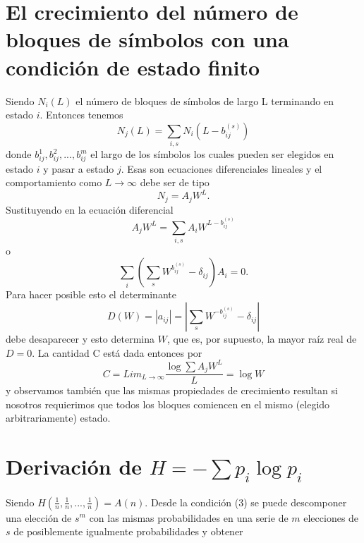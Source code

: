 \begin{appendices}

\chapter{El crecimiento del n\'umero de bloques de s\'imbolos con una
condici\'on de estado finito}

Siendo $N_{i}(L)$ el n\'umero de bloques de s\'imbolos de largo L
terminando en estado $i$.  Entonces tenemos
\begin{equation}
N_{j}(L)=\sum_{i,s} N_{i}(L-b_{ij}^{(s)})
\end{equation}
donde $b_{ij}^{1},b_{ij}^{2},...,b_{ij}^{m}$ el largo de los s\'imbolos los cuales pueden 
ser elegidos en estado $i$ y pasar a estado $j$. Esas son ecuaciones diferenciales lineales 
y el comportamiento como $L\rightarrow \infty $ debe ser de tipo
\begin{equation}
N_{j}=A_{j}W^{L}.
\end{equation}
Sustituyendo en la ecuaci\'on diferencial 
\begin{equation}
A_{j}W^{L} = \sum_{i,s}A_{i}W^{L-b_{ij}^{(s)}}
\end{equation}
o
\begin{equation}
\sum_{i}(\sum_{s}W^{b_{ij}^{(s)}}-\delta_{ij})A_{i}=0.
\end{equation}
Para hacer posible esto el determinante
\begin{equation}
D(W)=\left| a_{ij}\right| =\left| \sum_{s}W^{-b_{ij}^{(s)}}-\delta_{ij}\right|
\end{equation}
debe desaparecer y esto determina $W$, que es, por supuesto, la mayor raíz real de $D = 0$.
La cantidad C est\'a dada entonces por
\begin{equation}
C=Lim_{L\rightarrow \infty}\frac{\log \sum A_{j}W^{L}}{L}=\log W
\end{equation}
y observamos tambi\'en que las mismas propiedades de crecimiento resultan si nosotros 
requierimos que todos los bloques comiencen en el mismo (elegido arbitrariamente) estado.

\clearpage

\chapter{Derivaci\'on de $H=-\sum p_{i}\log  p_{i}$}

Siendo $H(\frac{1}{n},\frac{1}{n},...,\frac{1}{n})=A(n)$. Desde la
condici\'on (3) se puede descomponer una elecci\'on de $s^{m}$ con las
mismas probabilidades en una serie de $m$ elecciones de $s$ de
posiblemente igualmente probabilidades y obtener


\end{appendices}
